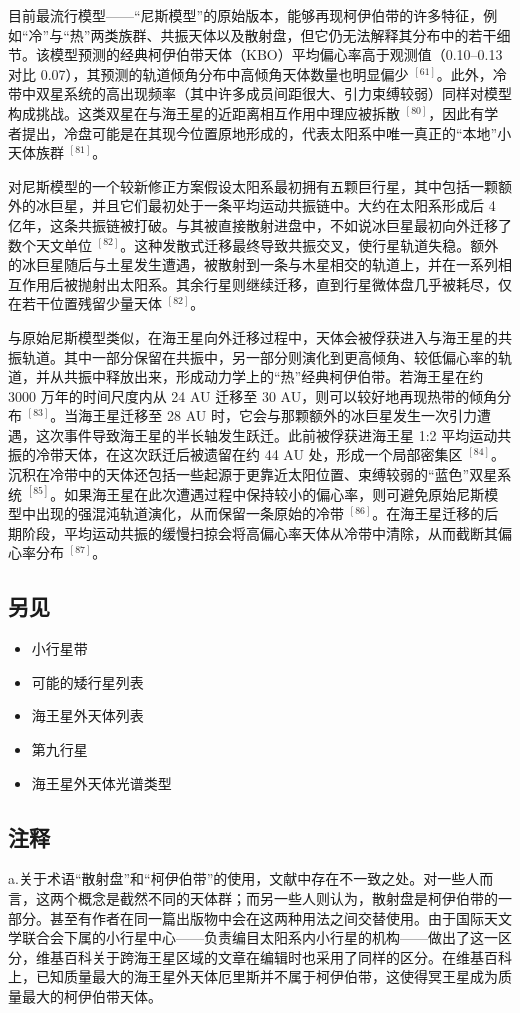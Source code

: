目前最流行模型——“尼斯模型”的原始版本，能够再现柯伊伯带的许多特征，例如“冷”与“热”两类族群、共振天体以及散射盘，但它仍无法解释其分布中的若干细节。该模型预测的经典柯伊伯带天体（KBO）平均偏心率高于观测值（0.10–0.13 对比 0.07），其预测的轨道倾角分布中高倾角天体数量也明显偏少 $^{[61]}$。此外，冷带中双星系统的高出现频率（其中许多成员间距很大、引力束缚较弱）同样对模型构成挑战。这类双星在与海王星的近距离相互作用中理应被拆散 $^{[80]}$，因此有学者提出，冷盘可能是在其现今位置原地形成的，代表太阳系中唯一真正的“本地”小天体族群 $^{[81]}$。

对尼斯模型的一个较新修正方案假设太阳系最初拥有五颗巨行星，其中包括一颗额外的冰巨星，并且它们最初处于一条平均运动共振链中。大约在太阳系形成后 4 亿年，这条共振链被打破。与其被直接散射进盘中，不如说冰巨星最初向外迁移了数个天文单位 $^{[82]}$。这种发散式迁移最终导致共振交叉，使行星轨道失稳。额外的冰巨星随后与土星发生遭遇，被散射到一条与木星相交的轨道上，并在一系列相互作用后被抛射出太阳系。其余行星则继续迁移，直到行星微体盘几乎被耗尽，仅在若干位置残留少量天体 $^{[82]}$。

与原始尼斯模型类似，在海王星向外迁移过程中，天体会被俘获进入与海王星的共振轨道。其中一部分保留在共振中，另一部分则演化到更高倾角、较低偏心率的轨道，并从共振中释放出来，形成动力学上的“热”经典柯伊伯带。若海王星在约 3000 万年的时间尺度内从 24 AU 迁移至 30 AU，则可以较好地再现热带的倾角分布 $^{[83]}$。当海王星迁移至 28 AU 时，它会与那颗额外的冰巨星发生一次引力遭遇，这次事件导致海王星的半长轴发生跃迁。此前被俘获进海王星 1:2 平均运动共振的冷带天体，在这次跃迁后被遗留在约 44 AU 处，形成一个局部密集区 $^{[84]}$。沉积在冷带中的天体还包括一些起源于更靠近太阳位置、束缚较弱的“蓝色”双星系统 $^{[85]}$。如果海王星在此次遭遇过程中保持较小的偏心率，则可避免原始尼斯模型中出现的强混沌轨道演化，从而保留一条原始的冷带 $^{[86]}$。在海王星迁移的后期阶段，平均运动共振的缓慢扫掠会将高偏心率天体从冷带中清除，从而截断其偏心率分布 $^{[87]}$。


\subsection{另见}
\begin{itemize}
\item 小行星带
\item 可能的矮行星列表
\item 海王星外天体列表
\item 第九行星
\item 海王星外天体光谱类型
\end{itemize}
\subsection{注释}
a.关于术语“散射盘”和“柯伊伯带”的使用，文献中存在不一致之处。对一些人而言，这两个概念是截然不同的天体群；而另一些人则认为，散射盘是柯伊伯带的一部分。甚至有作者在同一篇出版物中会在这两种用法之间交替使用。由于国际天文学联合会下属的小行星中心——负责编目太阳系内小行星的机构——做出了这一区分，维基百科关于跨海王星区域的文章在编辑时也采用了同样的区分。在维基百科上，已知质量最大的海王星外天体厄里斯并不属于柯伊伯带，这使得冥王星成为质量最大的柯伊伯带天体。
